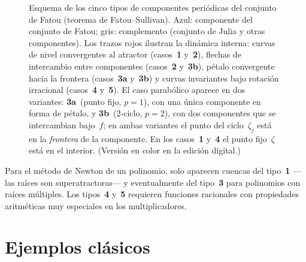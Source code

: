 \documentclass[11pt,a4paper]{article}
\theoremstyle{plain}
\theoremstyle{definition}
\theoremstyle{remark}
\begin{document}
\begin{figure}[htbp]
\caption{Esquema de los cinco tipos de componentes peri\'odicas del conjunto de Fatou
(teorema de Fatou--Sullivan).
Azul: componente del conjunto de Fatou; gris: complemento
(conjunto de Julia y otras componentes).
Los trazos rojos ilustran la din\'amica interna:
curvas de nivel convergentes al atractor (casos~\textbf{1} y~\textbf{2}),
flechas de intercambio entre componentes (casos~\textbf{2} y~\textbf{3b}),
p\'etalo convergente hacia la frontera (casos~\textbf{3a} y~\textbf{3b}) y
curvas invariantes bajo rotaci\'on irracional (casos~\textbf{4} y~\textbf{5}).
El caso parab\'olico aparece en dos variantes:
\textbf{3a}~(punto fijo, $p=1$), con una \'unica componente en forma de p\'etalo, y
\textbf{3b}~(2-ciclo, $p=2$), con dos componentes que se intercambian bajo~$f$;
en ambas variantes el punto del ciclo~$\zeta_j$ est\'a en la
\emph{frontera} de la componente.
En los casos~\textbf{1} y~\textbf{4} el punto fijo~$\zeta$ est\'a en el interior.
(Versi\'on en color en la edici\'on digital.)}
\label{fig:fatou-tipos}
\end{figure}


Para el método de Newton de un polinomio, solo aparecen cuencas del
tipo~\textbf{1} —las raíces son superatractoras— y eventualmente del tipo~\textbf{3}
para polinomios con raíces múltiples.
Los tipos~\textbf{4} y~\textbf{5} requieren funciones racionales con propiedades
aritméticas muy especiales en los multiplicadores.

\section{Ejemplos clásicos}
\label{sec:ejemplos}
\end{document}

